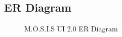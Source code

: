 \subsection{ER Diagram}
\begin{center}
\begin{figure}[ht!]
  \caption{M.O.S.I.S UI 2.0 ER Diagram}
\end{figure}
\end{center}